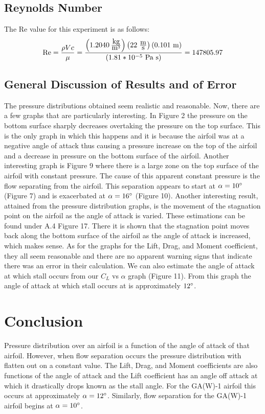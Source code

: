 \documentclass[12pt]{article}
\begin{document}
\subsection{Reynolds Number}
The Re value for this experiment is as follows:
\[\mbox{Re} = \frac{\rho V c}{\mu} =  \frac{\left(1.2040 \hspace{2 pt} \frac{\mbox{kg}}{\mbox{m}^3}\right) \left(22 \hspace{3 pt}\frac{\mbox{m}}{\mbox{s}}\right) \left(0.101 \mbox{ m}\right)}{(1.81*10^{-5} \mbox{ Pa s})} = 147805.97\]

\newpage
\subsection{General Discussion of Results and of Error}
The pressure distributions obtained seem realistic and reasonable. Now, there are a few graphs that are particularly interesting. In Figure 2 the pressure on the bottom surface sharply decreases overtaking the pressure on the top surface. This is the only graph in which this happens and it is because the airfoil was at a negative angle of attack thus causing a pressure increase on the top of the airfoil and a decrease in pressure on the bottom surface of the airfoil. Another interesting graph is Figure 9 where there is a large zone on the top surface of the airfoil with constant pressure. The cause of this apparent constant pressure is the flow separating from the airfoil. This separation appears to start at \(\alpha = 10\degree\) (Figure 7) and is exacerbated at \(\alpha = 16 \degree\) (Figure 10). 
\newline
\newline
Another interesting result, attained from the pressure distribution graphs, is the movement of the stagnation point on the airfoil as the angle of attack is varied. These estimations can be found under A.4 Figure 17. There it is shown that the stagnation point moves back along the bottom surface of the airfoil as the angle of attack is increased, which makes sense.
\newline
\newline
As for the graphs for the Lift, Drag, and Moment coefficient, they all seem reasonable and there are no apparent warning signs that indicate there was an error in their calculation. We can also estimate the angle of attack at which stall occurs from our \(C_L\) vs \(\alpha\) graph (Figure 11). From this graph the angle of attack at which stall occurs at is approximately \(12 \degree\). 
\newpage
\section{Conclusion}
Pressure distribution over an airfoil is a function of the angle of attack of that airfoil. However, when flow separation occurs the pressure distribution with flatten out on a constant value. The Lift, Drag, and Moment coefficients are also functions of the angle of attack and the Lift coefficient has an angle off attack at which it drastically drops known as the stall angle. For the GA(W)-1 airfoil this occurs at approximately \(\alpha = 12 \degree\). Similarly, flow separation for the GA(W)-1 airfoil begins at \(\alpha = 10\degree\). 
\end{document}
